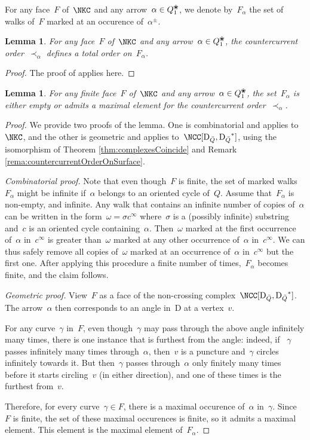 \documentclass{amsart}
\newtheorem{lemma}[theorem]{Lemma}
\theoremstyle{definition}
\newcommand{\blossom}{^\text{\ding{96}}} %
\newcommand{\dual}{^*} %
\newcommand{\dissection}{\mathrm{D}} %
\begin{document}
For any face~$F$ of~$\NKC$ and any arrow~$\alpha\in Q_1\blossom$, we denote by~$F_\alpha$ the set of walks of~$F$ marked at an occurence of~$\alpha^\pm$.

\begin{lemma}
\label{lemm:countercurrentOrderIsTotal}
For any face~$F$ of~$\NKC$ and any arrow~$\alpha\in Q_1\blossom$, the countercurrent order~$\prec_\alpha$ defines a total order on~$F_{\alpha}$.
\end{lemma}
\begin{proof}
 The proof of \cite[Lemma 2.21]{PaluPilaudPlamondon} applies here.
\end{proof}

\begin{lemma}
\label{lemm:facesHaveMaximalElement}
For any finite face~$F$ of~$\NKC$ and any arrow~$\alpha\in Q_1\blossom$, the set~$F_\alpha$ is either empty or admits a maximal element for the countercurrent order~$\prec_\alpha$.
\end{lemma}
\begin{proof}
 We provide two proofs of the lemma.  One is combinatorial and applies to~$\NKC$, and the other is geometric and applies to~$\NCC[\dissection_{\bar Q}, {\dissection_{\bar Q}}\dual]$, using the isomorphism of Theorem \ref{thm:complexesCoincide} and Remark \ref{rema:countercurrentOrderOnSurface}.
 
 {\it Combinatorial proof.}
 Note that even though~$F$ is finite, the set of marked walks~$F_\alpha$ might be infinite if~$\alpha$ belongs to an oriented cycle of~$Q$.
 Assume that~$F_\alpha$ is non-empty, and infinite.
 Any walk that contains an infinite number of copies of~$\alpha$ can be written in the form~$\omega=\sigma c^\infty$ where~$\sigma$ is a (possibly infinite) substring and~$c$ is an oriented cycle containing~$\alpha$.
 Then~$\omega$ marked at the first occurrence of~$\alpha$ in~$c^\infty$ is greater than~$\omega$ marked at any other occurrence of~$\alpha$ in~$c^\infty$.
 We can thus safely remove all copies of~$\omega$ marked at an occurrence of~$\alpha$ in~$c^\infty$ but the first one.
 After applying this procedure a finite number of times,~$F_\alpha$ becomes finite, and the claim follows.
 
 {\it Geometric proof.} View~$F$ as a face of the non-crossing complex~$\NCC[\dissection_{\bar Q}, {\dissection_{\bar Q}}\dual]$.
 The arrow~$\alpha$ then corresponds to an angle in~$\dissection$ at a vertex~$v$.  
 
 For any curve~$\gamma$ in~$F$, even though~$\gamma$ may pass through the above angle infinitely many times, there is one instance that is furthest from the angle:
 indeed, if ~$\gamma$ passes infinitely many times through~$\alpha$, then~$v$ is a puncture and~$\gamma$ circles infinitely towards it.
 But then~$\gamma$ passes through~$\alpha$ only finitely many times before it starts circling~$v$ (in either direction), and one of these times is the furthest from~$v$.
  
 Therefore, for every curve~$\gamma\in F$, there is a maximal occurence of~$\alpha$ in~$\gamma$.
 Since~$F$ is finite, the set of these maximal occurences is finite, so it admits a maximal element.  
 This element is the maximal element of~$F_\alpha$.
\end{proof}
\end{document}

